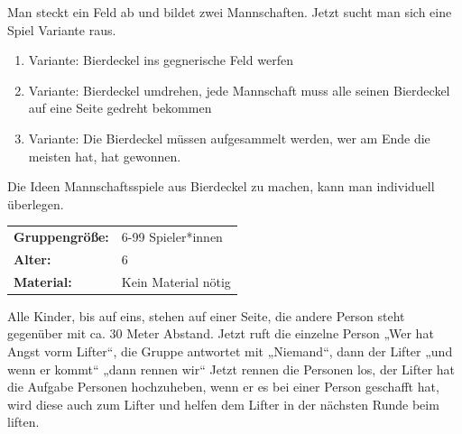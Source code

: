     Man steckt ein Feld ab und bildet zwei Mannschaften.  Jetzt sucht man sich eine Spiel Variante raus.
    \begin{enumerate}
        \item Variante: Bierdeckel ins gegnerische Feld werfen
        \item Variante: Bierdeckel umdrehen, jede Mannschaft muss alle seinen Bierdeckel auf eine Seite gedreht bekommen
        \item Variante: Die Bierdeckel müssen aufgesammelt werden, wer am Ende die meisten hat, hat gewonnen.
    \end{enumerate}
    Die Ideen Mannschaftsspiele aus Bierdeckel zu machen, kann man individuell überlegen. 
    \\


\begin{table}[H]
\begin{tabular}{>{\bfseries}lp{8cm}}
   Gruppengröße:   & 6-99 Spieler*innen\\
    Alter: & 6 \\
    Material: & Kein Material nötig \\
\end{tabular}
\end{table} 
Alle Kinder, bis auf eins, stehen auf einer Seite, die andere Person steht gegenüber mit ca. 30 Meter Abstand. Jetzt ruft die einzelne Person „Wer hat Angst vorm Lifter“, die Gruppe antwortet mit „Niemand“, dann der Lifter „und wenn er kommt“ „dann rennen wir“ Jetzt rennen die Personen los, der Lifter hat die Aufgabe Personen hochzuheben, wenn er es bei einer Person geschafft hat, wird diese auch zum Lifter und helfen dem Lifter in der nächsten Runde beim liften.  \\



